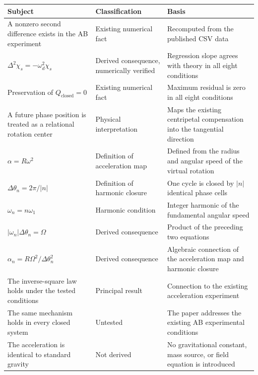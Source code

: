 \documentclass[
  10pt,
  a4paper,
]{article}
\newcounter{none} %
\begin{document}
{\def\LTcaptype{none} %
\begin{longtable}[]{@{}
  >{\raggedright\arraybackslash}p{}
  >{\raggedright\arraybackslash}p{}
  >{\raggedright\arraybackslash}p{}@{}}
\toprule\noalign{}
\begin{minipage}[b]{\linewidth}\raggedright
Subject
\end{minipage} & \begin{minipage}[b]{\linewidth}\raggedright
Classification
\end{minipage} & \begin{minipage}[b]{\linewidth}\raggedright
Basis
\end{minipage} \\
\midrule\noalign{}
\endhead
\bottomrule\noalign{}
\endlastfoot
A nonzero second difference exists in the AB experiment & Existing
numerical fact & Recomputed from the published CSV data \\
\(\Delta^2\chi_s=-\omega_d^2\chi_s\) & Derived consequence, numerically
verified & Regression slope agrees with theory in all eight
conditions \\
Preservation of \(Q_{\mathrm{closed}}=0\) & Existing numerical fact &
Maximum residual is zero in all eight conditions \\
A future phase position is treated as a relational rotation center &
Physical interpretation & Maps the existing centripetal compensation
into the tangential direction \\
\(\alpha=R\omega^2\) & Definition of acceleration map & Defined from the
radius and angular speed of the virtual rotation \\
\(\Delta\theta_n=2\pi/\lvert n\rvert\) & Definition of harmonic closure
& One cycle is closed by \(\lvert n\rvert\) identical phase cells \\
\(\omega_n=n\omega_1\) & Harmonic condition & Integer harmonic of the
fundamental angular speed \\
\(\lvert\omega_n\rvert\Delta\theta_n=\Omega\) & Derived consequence &
Product of the preceding two equations \\
\(\alpha_n=R\Omega^2/\Delta\theta_n^2\) & Derived consequence &
Algebraic connection of the acceleration map and harmonic closure \\
The inverse-square law holds under the tested conditions & Principal
result & Connection to the existing acceleration experiment \\
The same mechanism holds in every closed system & Untested & The paper
addresses the existing AB experimental conditions \\
The acceleration is identical to standard gravity & Not derived & No
gravitational constant, mass source, or field equation is introduced \\
\end{longtable}
}
\end{document}
